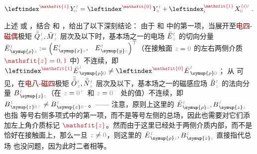 \begin{align} \label{eq:1BC}
	\leftindex^{\textcolor{Maroon}{\mathsfit{1}}} \;\! Y^{\;\!\mathcolor{gray}{t}}_{\mathcolor{gray}{0}} = \leftindex^{\textcolor{Maroon}{\mathsfit{0}}} \;\! Y^{\;\!\mathcolor{gray}{t}}_{\mathcolor{gray}{0}} + \leftindex^{\textcolor{Maroon}{\mathsfit{1}}}_{\textcolor{Maroon}{i}} \;\! X^{\;\!\textcolor{Maroon}{(i)}\mathcolor{gray}{t}}_{\mathcolor{gray}{0}} ~.
\end{align}

上述  或 ，结合  和 ，给出了以下深刻结论：{\one} 由于  和  中的第一项，当展开至\textcolor{Maroon}{电四-磁偶}极矩 $\bar{\bar{Q}}^{\;\!\mathcolor{gray}{t}}_{\;\!\mathcolor{gray}{z}}, \bar{M}^{\;\!\mathcolor{gray}{t}}_{\;\!\mathcolor{gray}{z}}$ 层次及以下时，基本场之一的电场 $\bar{E}^{\;\!\mathcolor{gray}{t}}_{\;\!\mathcolor{gray}{z}}$ 的切向分量 $\bar{E}^{\;\!\mathcolor{gray}{t}}_{\;\! \symup{\rho} \mathcolor{gray}{z}} := \begin{pmatrix} E^{\;\!\mathcolor{gray}{t}}_{\;\! \symup{x} \mathcolor{gray}{z}}, & E^{\;\!\mathcolor{gray}{t}}_{\;\! \symup{y} \mathcolor{gray}{z}} \end{pmatrix}^\top$（在接触面 $\mathcolor{gray}{z \mathcolor{black}{=} 0}$ 的左右两侧介质 $\textcolor{Maroon}{\mathsfit{z}} = \textcolor{Maroon}{0,1}$ 中）不连续，即 $\leftindex^{\textcolor{Maroon}{\mathsfit{1}}} {\bar{E}}^{\;\!\mathcolor{gray}{t}}_{\;\! \symup{\rho} \mathcolor{gray}{0}} \neq \leftindex^{\textcolor{Maroon}{\mathsfit{0}}} {\bar{E}}^{\;\!\mathcolor{gray}{t}}_{\;\! \symup{\rho} \mathcolor{gray}{0}}$；{\two} 从  可见，在\textcolor{Maroon}{电八-磁四}极矩 $\bar{\bar{\bar{O}}}^{\;\!\mathcolor{gray}{t}}_{\;\!\mathcolor{gray}{z}}, \bar{\bar{N}}^{\;\!\mathcolor{gray}{t}}_{\;\!\mathcolor{gray}{z}}$ 层次及以下，基本场之一的磁感应场 $\bar{B}^{\;\!\mathcolor{gray}{t}}_{\;\!\mathcolor{gray}{z}}$ 的法向分量 $B^{\;\!\mathcolor{gray}{t}}_{\;\! \symup{z} \mathcolor{gray}{z}}$（在 $\mathcolor{gray}{z \mathcolor{black}{=} 0^+}$ 和 $\mathcolor{gray}{z \mathcolor{black}{=} 0^-}$ 处的值）不连续，即 $B^{\;\!\mathcolor{gray}{t}}_{\;\! \symup{z} \mathcolor{gray}{0^+}} \neq B^{\;\!\mathcolor{gray}{t}}_{\;\! \symup{z} \mathcolor{gray}{0^-}}$。—— 注意，原则上这里的 $\bar{E}^{\;\!\mathcolor{gray}{t}}_{\;\! \symup{\rho} \mathcolor{gray}{z}},B^{\;\!\mathcolor{gray}{t}}_{\;\! \symup{z} \mathcolor{gray}{z}}$ 也指  等号右侧多项式中的第一项，而不是等号左侧的总场，因此也需要对它们添加左上角介质标记 $\textcolor{Maroon}{\mathsfit{z}}$。然而由于这里已经处于两侧介质内部，而不是恰好在接触面上，那么一旦 $\mathcolor{gray}{z} \neq \mathcolor{gray}{0}$，则这里的 $\bar{E}^{\;\!\mathcolor{gray}{t}}_{\;\! \symup{\rho} \mathcolor{gray}{z}},B^{\;\!\mathcolor{gray}{t}}_{\;\! \symup{z} \mathcolor{gray}{z}}$ 直接指代总场  也没问题，因为此时二者相等。

